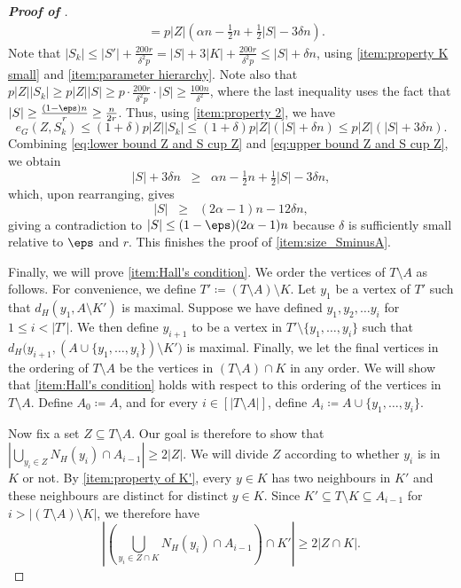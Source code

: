 \documentclass[10pt,a4paper,reqno]{amsart}
\begin{document}
\begin{proof}[\textbf{Proof of }]
\begin{align}
    &= p|Z|\left(\alpha n - \tfrac{1}{2}n + \tfrac{1}{2}|S| -3\delta n\right).
 \label{eq:lower bound Z and S cup Z}
\end{align}
Note that $|S_k|\le |S'| + \frac{200r}{\delta^2 p} = |S| + 3|K| + \frac{200r}{\delta^2 p} \le |S| + \delta n$, using \ref{item:property K small} and \ref{item:parameter hierarchy}.
Note also that $p|Z||S_k|\ge p|Z||S| \ge  p\cdot \frac{200r}{\delta^2 p} \cdot |S| \ge \frac{100n}{\delta^2}$, where the last inequality uses the fact that $|S| \ge \frac{(1-\eps)n}{r}\ge \frac{n}{2r}$. Thus, using \ref{item:property 2}, we have 
\begin{equation}\label{eq:upper bound Z and S cup Z}
    e_G(Z,S_k) \le (1+\delta)p|Z||S_k|\le (1+\delta)p|Z|\left(|S| + \delta n\right) 
    \le p|Z|\left(|S| + 3\delta n\right).
\end{equation}
Combining \eqref{eq:lower bound Z and S cup Z} and \eqref{eq:upper bound Z and S cup Z}, we obtain 
\[
|S| + 3\delta n \;\; \ge \;\; \alpha n - \tfrac{1}{2}n + \tfrac{1}{2}|S| -3\delta n,
\]
which, upon rearranging, gives
\[
|S| \;\; \ge \;\; (2\alpha - 1) n -12\delta n,
\]
giving a contradiction to $|S| \le (1-\eps)(2\alpha - 1)n$ because $\delta$ is sufficiently small relative to $\eps$ and $r$. This finishes the proof of \ref{item:size_SminusA}.


Finally, we will prove \ref{item:Hall's condition}. We order the vertices of $T\setminus A$ as follows. For convenience, we define $T' \coloneqq (T \setminus A) \setminus K$. Let $y_1$ be a vertex of $T'$ such that $d_H(y_1, A\setminus K')$ is maximal. Suppose we have defined $y_1,y_2,\dots y_{i}$ for $1 \le i < |T'|$. We then define $y_{i+1}$ to be a vertex in $T'\setminus\{y_1,\ldots,y_{i}\}$ such that $d_H\big(y_{i+1}, (A\cup\{y_1,\ldots,y_{i}\})\setminus K'\big)$ is maximal. Finally, we let the final vertices in the ordering of $T\setminus A$ be the vertices in $(T \setminus A)\cap K$ in any order. We will show that \ref{item:Hall's condition} holds with respect to this ordering of the vertices in $T\setminus A$. Define $A_0 \coloneqq A$, and for every $i \in [|T\setminus A|]$, define $A_i \coloneqq A\cup\{y_1,\ldots,y_i\}$.

Now fix a set $Z \subseteq T\setminus A$. Our goal is therefore to show that $\left|\bigcup_{y_i \in Z} N_H(y_i) \cap A_{i-1} \right| \ge 2|Z|$.
We will divide $Z$ according to whether $y_i$ is in $K$ or not. By \ref{item:property of K'}, every $y \in K$ has two neighbours in $K'$ and these neighbours are distinct for distinct $y \in K$. Since $K' \subseteq T \setminus K \subseteq A_{i-1}$ for $i > |(T\setminus A)\setminus K|$, we therefore have 
\begin{equation}\label{eqn:Z_cap_K}
\left|\left(\bigcup_{y_i \in Z \cap K} N_H(y_i) \cap A_{i-1} \right)\cap K'\right| \ge 2|Z \cap K|.
\end{equation}


\end{proof}
\end{document}
